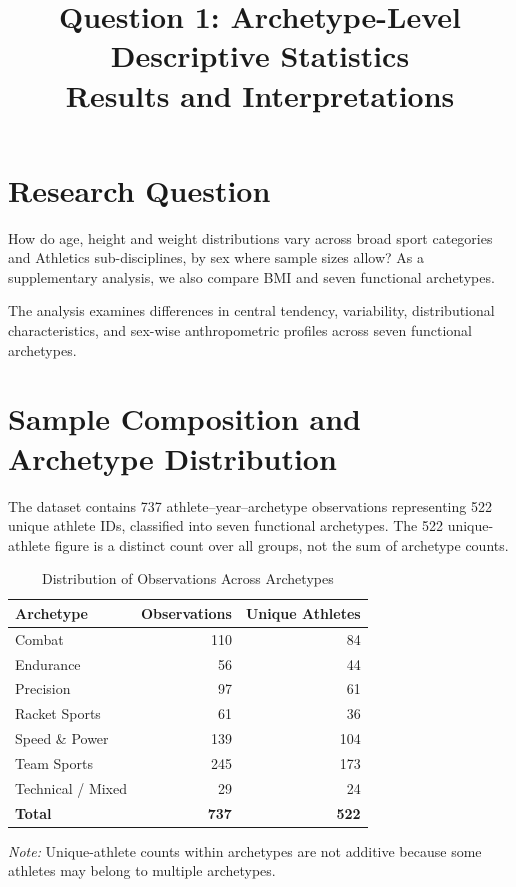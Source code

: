 \documentclass[11pt,a4paper]{article}
\title{\textbf{Question 1: Archetype-Level Descriptive Statistics}\\
\large Results and Interpretations}
\author{}
\date{}
\begin{document}
\maketitle

\section{Research Question}

How do age, height and weight distributions vary across broad sport categories
and Athletics sub-disciplines, by sex where sample sizes allow?
As a supplementary analysis, we also compare BMI and seven functional archetypes.

The analysis examines differences in central
tendency, variability, distributional characteristics,
and sex-wise anthropometric profiles across seven
functional archetypes.

\section{Sample Composition and Archetype Distribution}

The dataset contains 737 athlete--year--archetype
observations representing 522 unique athlete IDs,
classified into seven functional archetypes. The 522 unique-athlete figure
is a distinct count over all groups, not the sum of archetype counts.

\begin{table}[H]
\centering
\caption{Distribution of Observations Across Archetypes}
\begin{tabular}{lrr}
\toprule
\textbf{Archetype} &
\textbf{Observations} &
\textbf{Unique Athletes} \\
\midrule
Combat             & 110 & 84  \\
Endurance          & 56  & 44  \\
Precision          & 97  & 61  \\
Racket Sports      & 61  & 36  \\
Speed \& Power     & 139 & 104 \\
Team Sports        & 245 & 173 \\
Technical / Mixed  & 29  & 24  \\
\midrule
\textbf{Total}     & \textbf{737} & \textbf{522} \\
\bottomrule
\end{tabular}
\end{table}

\textit{Note:} Unique-athlete counts within
archetypes are not additive because some athletes
may belong to multiple archetypes.
\end{document}
